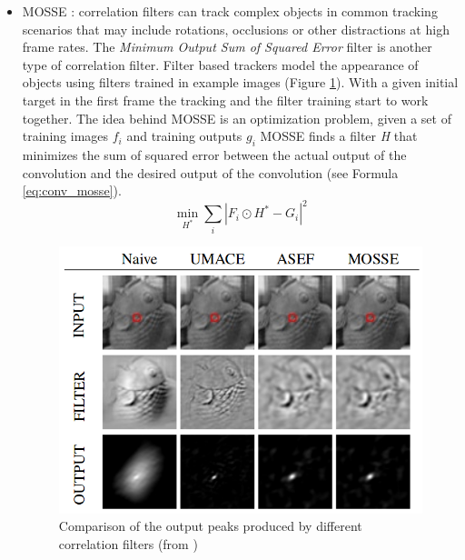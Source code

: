 \begin{itemize}
\item MOSSE \cite{bolme2010visual}: correlation filters can track complex objects in common tracking scenarios that may include rotations, occlusions or other distractions at high frame rates. The \textit{Minimum Output Sum of Squared Error} filter is another type of correlation filter. Filter based trackers model the appearance of objects using filters trained in example images (Figure \ref{fig:mosse}). With a given initial target in the first frame the tracking and the filter training start to work together. The idea behind MOSSE is an optimization problem, given a set of training images $f_i$ and training outputs $g_i$ MOSSE finds a filter \textit{H} that minimizes the sum of squared error between the actual output of the convolution and the desired output of the convolution (see Formula \ref{eq:conv_mosse}).
\begin{equation}
\min_{H^*}\sum_{i}\left|F_i \odot H^* - G_i\right|^2
\label{eq:conv_mosse}
\end{equation}

\begin{figure}[H]
\begin{center}
\includegraphics[scale=0.35]{figures/mosse_filter.png}
\caption{Comparison of the output peaks produced by different correlation filters (from \cite{bolme2010visual})}
\label{fig:mosse}
\end{center}
\end{figure} 


\end{itemize}
